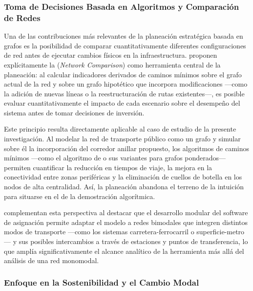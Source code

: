 \subsubsection{Toma de Decisiones Basada en Algoritmos y Comparación de Redes}
\label{subsubsec:comparacion-redes}

Una de las contribuciones más relevantes de la planeación estratégica basada en
grafos es la posibilidad de comparar cuantitativamente diferentes configuraciones de
red antes de ejecutar cambios físicos en la infraestructura.
\textcite{fortin2016innovative} proponen explícitamente la 
(\textit{Network Comparison}) como herramienta central de la planeación: al calcular
indicadores derivados de caminos mínimos sobre el grafo actual de la red y sobre un
grafo hipotético que incorpora modificaciones ---como la adición de nuevas líneas o
la reestructuración de rutas existentes---, es posible evaluar cuantitativamente el
impacto de cada escenario sobre el desempeño del sistema antes de tomar
decisiones de inversión.

Este principio resulta directamente aplicable al caso de estudio de la presente
investigación. Al modelar la red de transporte público como un grafo y simular sobre
él la incorporación del corredor anillar propuesto, los algoritmos de caminos mínimos
---como el algoritmo de \dijkstra{} o sus variantes para grafos ponderados--- permiten
cuantificar la reducción en tiempos de viaje, la mejora en la conectividad entre zonas
periféricas y la eliminación de cuellos de botella en los nodos de alta centralidad.
Así, la planeación abandona el terreno de la intuición para situarse en el de la
demostración algorítmica.

\textcite{moreno2023} complementan esta perspectiva al destacar que el desarrollo
modular del software de asignación permite adaptar el modelo a redes bimodales que
integren distintos modos de transporte ---como los sistemas carretera-ferrocarril o
superficie-metro--- y sus posibles intercambios a través de estaciones y puntos de
transferencia, lo que amplía significativamente el alcance analítico de la herramienta
más allá del análisis de una red monomodal.

\subsubsection{Enfoque en la Sostenibilidad y el Cambio Modal}
\label{subsubsec:sostenibilidad-cambio-modal}

